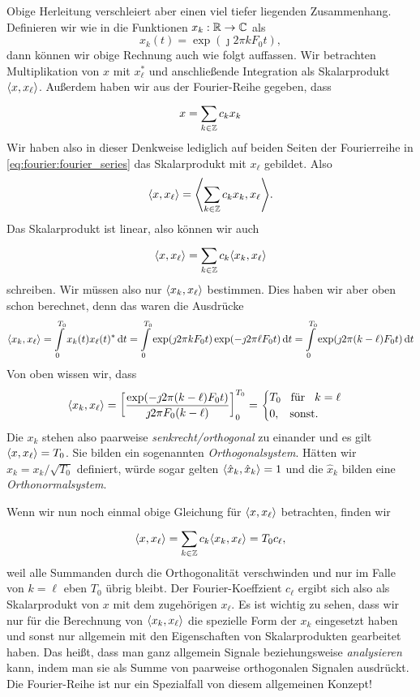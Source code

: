 Obige Herleitung verschleiert aber einen viel tiefer liegenden Zusammenhang.
Definieren wir wie in  die Funktionen $x_k : \mathbb{R} \rightarrow \mathbb{C}$ als
\[
x_k(t) = \exp(\jmath 2 \pi k F_0 t),
\]
dann können wir obige Rechnung auch wie folgt auffassen.
Wir betrachten Multiplikation von $x$ mit $x_\ell^\ast$ und anschließende Integration als Skalarprodukt ${\left\langle x,x_\ell \right\rangle}$. 
Außerdem haben wir aus der Fourier-Reihe gegeben, dass
\[
x = {\sum\limits_{k \in \mathbb{Z}}^{}{c_k x_k}}
\]
Wir haben also in dieser Denkweise lediglich auf beiden Seiten der Fourierreihe in \eqref{eq:fourier:fourier_series} das Skalarprodukt mit $x_\ell$ gebildet.
Also
\[
{\left\langle x,x_\ell \right\rangle} = {\left\langle {\sum\limits_{k \in \mathbb{Z}}^{}{c_k x_k}},x_\ell \right\rangle}.
\]
Das Skalarprodukt ist linear, also können wir auch
\[
{\left\langle x,x_\ell \right\rangle} = {\sum\limits_{k \in \mathbb{Z}}^{}{c_k {\left\langle x_k,x_\ell \right\rangle}}}
\]
schreiben.
Wir müssen also nur ${\left\langle x_k,x_\ell \right\rangle}$ bestimmen. 
Dies haben wir aber oben schon berechnet, denn das waren die Ausdrücke
\[
{\left\langle x_k,x_\ell \right\rangle}
    = {\int\limits_{0}^{T_0}{x_k(t) x_\ell(t)^\ast}\,\mathrm{d}{t}}
    = {\int\limits_{0}^{T_0}{\exp(\jmath 2 \pi k F_0 t) \exp(-\jmath 2 \pi \ell F_0 t)}\,\mathrm{d}{t}}
    = {\int\limits_{0}^{T_0}{\exp(\jmath 2 \pi (k - \ell) F_0 t)}\,\mathrm{d}{t}}
\]
Von oben wissen wir, dass
\[
{\left\langle x_k,x_\ell \right\rangle} 
    = \left[
        \frac{
            \exp(-\jmath 2 \pi (k - \ell) F_0 t)
        }{
            \jmath 2 \pi F_0(k - \ell)
        }
    \right]_{0}^{T_0}
    = \begin{cases}
        T_0 {\hspace{3mm} \text{f\"ur} \hspace{3mm}} k = \ell \\
        0, {\hspace{3mm} \text{sonst.} \hspace{3mm}}
    \end{cases}
\]
Die $x_k$ stehen also paarweise \emph{senkrecht/orthogonal} zu einander und es gilt ${\left\langle x,x_\ell \right\rangle} = T_0$.
Sie bilden ein sogenannten \emph{Orthogonalsystem}.
Hätten wir $\hat{x}_k = x_k / \sqrt{T_0}$ definiert, würde sogar gelten ${\left\langle \hat{x}_k,\hat{x}_k \right\rangle} = 1$ und die $\hat{x}_k$ bilden eine \emph{Orthonormalsystem}.

Wenn wir nun noch einmal obige Gleichung für ${\left\langle x,x_\ell \right\rangle}$ betrachten, finden wir
\[
{\left\langle x,x_\ell \right\rangle} 
    = {\sum\limits_{k \in \mathbb{Z}}^{}{c_k {\left\langle x_k,x_\ell \right\rangle}}}
    = T_0 c_\ell,
\]
weil alle Summanden durch die Orthogonalität verschwinden und nur im Falle von $k = \ell$ eben $T_0$ übrig bleibt.
Der Fourier-Koeffzient $c_\ell$ ergibt sich also als Skalarprodukt von $x$ mit dem zugehörigen $x_\ell$.
Es ist wichtig zu sehen, dass wir nur für die Berechnung von ${\left\langle x_k,x_\ell \right\rangle}$ die spezielle Form der $x_k$ eingesetzt haben und sonst nur allgemein mit den Eigenschaften von Skalarprodukten gearbeitet haben.
Das heißt, dass man ganz allgemein Signale  beziehungsweise \emph{analysieren} kann, indem man sie als Summe von paarweise orthogonalen Signalen ausdrückt.
Die Fourier-Reihe ist nur ein Spezialfall von diesem allgemeinen Konzept!

